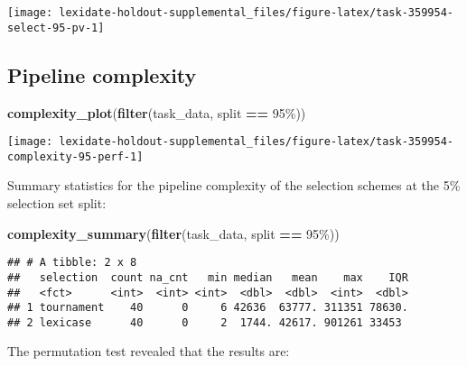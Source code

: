 \documentclass[
]{book}
\newenvironment{Shaded}{\begin{snugshade}}{\end{snugshade}}
\newcommand{\FunctionTok}[1]{\textcolor[rgb]{0.13,0.29,0.53}{\textbf{#1}}}
\newcommand{\NormalTok}[1]{#1}
\newcommand{\SpecialCharTok}[1]{\textcolor[rgb]{0.81,0.36,0.00}{\textbf{#1}}}
\newcommand{\StringTok}[1]{\textcolor[rgb]{0.31,0.60,0.02}{#1}}
\begin{document}
\texttt{[image: lexidate-holdout-supplemental\_files/figure-latex/task-359954-select-95-pv-1]}

\hypertarget{pipeline-complexity-9}{%
\subsection{Pipeline complexity}\label{pipeline-complexity-9}}

\begin{Shaded}
\begin{Highlighting}[]
\FunctionTok{complexity\_plot}\NormalTok{(}\FunctionTok{filter}\NormalTok{(task\_data, split }\SpecialCharTok{==} \StringTok{\textquotesingle{}95\%\textquotesingle{}}\NormalTok{))}
\end{Highlighting}
\end{Shaded}

\texttt{[image: lexidate-holdout-supplemental\_files/figure-latex/task-359954-complexity-95-perf-1]}

Summary statistics for the pipeline complexity of the selection schemes at the 5\% selection set split:

\begin{Shaded}
\begin{Highlighting}[]
\FunctionTok{complexity\_summary}\NormalTok{(}\FunctionTok{filter}\NormalTok{(task\_data, split }\SpecialCharTok{==} \StringTok{\textquotesingle{}95\%\textquotesingle{}}\NormalTok{))}
\end{Highlighting}
\end{Shaded}

\begin{verbatim}
## # A tibble: 2 x 8
##   selection  count na_cnt   min median   mean    max    IQR
##   <fct>      <int>  <int> <int>  <dbl>  <dbl>  <int>  <dbl>
## 1 tournament    40      0     6 42636  63777. 311351 78630.
## 2 lexicase      40      0     2  1744. 42617. 901261 33453
\end{verbatim}

The permutation test revealed that the results are:
\end{document}
